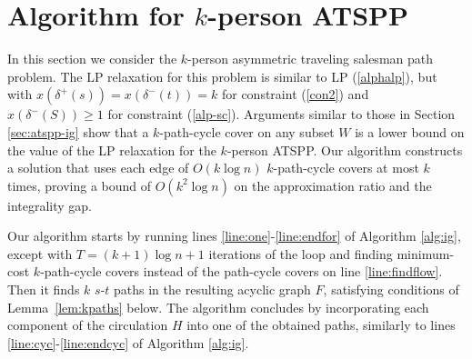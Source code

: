 \documentclass[11pt]{article}
\begin{document}
\section{Algorithm for $k$-person ATSPP}\label{sec:kperson}
In this section we consider the 
$k$-person asymmetric traveling salesman path problem. 
The LP relaxation for this problem is similar to LP (\ref{alphalp}), but with 
$x(\delta^+(s))=x(\delta^-(t))=k$ for constraint (\ref{con2}) and $x(\delta^-(S))\geq 1$ for constraint (\ref{alp-sc}). 
Arguments similar to those in Section \ref{sec:atspp-ig} show that a $k$-path-cycle cover on any subset $W$ is a 
lower bound on the value of the LP relaxation for the $k$-person ATSPP. Our algorithm constructs a solution that 
uses each edge of $O(k \log n)$ $k$-path-cycle covers at most $k$ times, proving a bound of $O(k^2 \log n)$ on the  approximation ratio and the integrality gap.

Our algorithm starts by running lines \ref{line:one}-\ref{line:endfor} of Algorithm \ref{alg:ig}, except 
with $T = (k+1)\log n +1$ iterations of the loop and finding minimum-cost $k$-path-cycle covers instead of 
the path-cycle covers on line \ref{line:findflow}. Then it finds $k$ $s$-$t$ paths in the resulting acyclic
 graph $F$, satisfying conditions of Lemma~\ref{lem:kpaths} below. The algorithm concludes by incorporating each 
component of the circulation $H$ into one of the obtained paths, similarly to lines \ref{line:cyc}-\ref{line:endcyc} 
of Algorithm \ref{alg:ig}. 
\end{document}
